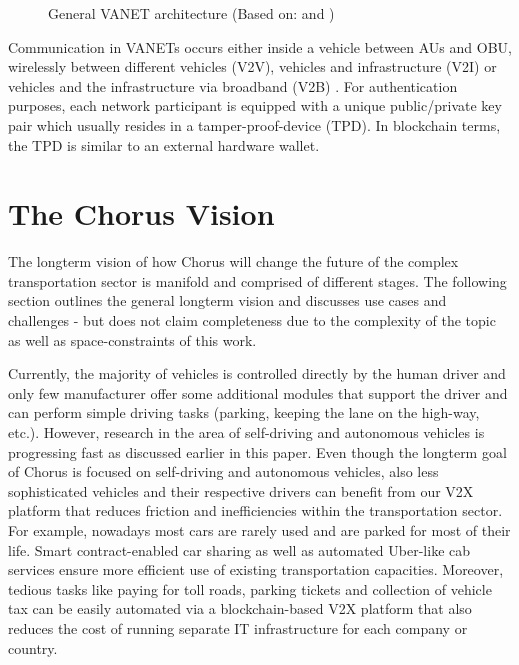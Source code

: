 \documentclass{llncs}
\begin{document}
{\begin{figure}[ht]
				\caption{General VANET architecture (Based on: \protect\cite{baldessari2007car} and \cite{leiding2016self})}
				\label{fig:vanets}
			\end{figure}			
			Communication in VANETs occurs either inside a vehicle between AUs and OBU, wirelessly between different vehicles (V2V), vehicles and infrastructure (V2I) or vehicles and the infrastructure via broadband (V2B) \cite{faezipour2012progress}. For authentication purposes, each network participant is equipped with a unique public/private key pair which usually resides in a tamper-proof-device (TPD). In blockchain terms, the TPD is similar to an external hardware wallet.
			
		


	\section{The Chorus Vision}
		\label{s:section-3}
		
		
		The longterm vision of how Chorus will change the future of the complex transportation sector is manifold and comprised of different stages. The following section outlines the general longterm vision and discusses use cases and challenges - but does not claim completeness due to the complexity of the topic as well as space-constraints of this work. 
		
		Currently, the majority of vehicles is controlled directly by the human driver and only few manufacturer offer some additional modules that support the driver and can perform simple driving tasks (parking, keeping the lane on the high-way, etc.). However, research in the area of self-driving and autonomous vehicles is progressing fast as discussed earlier in this paper. Even though the longterm goal of Chorus is focused on self-driving and autonomous vehicles, also less sophisticated vehicles and their respective drivers can benefit from our V2X platform that reduces friction and inefficiencies within the transportation sector. For example, nowadays most cars are rarely used and are parked for most of their life. Smart contract-enabled car sharing as well as automated Uber-like cab services ensure more efficient use of existing transportation capacities. Moreover, tedious tasks like paying for toll roads, parking tickets and collection of vehicle tax can be easily automated via a blockchain-based V2X platform that also reduces the cost of running separate IT infrastructure for each company or country.
		
}
\end{document}
